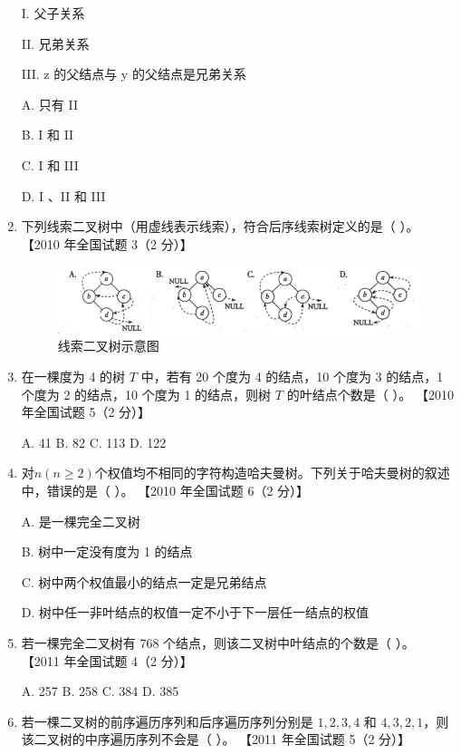 \documentclass[lang=cn,newtx,10pt,scheme=chinese]{../../elegantbook}
\begin{document}
\begin{enumerate}
    I. 父子关系  

    II. 兄弟关系  

    III. z 的父结点与 y 的父结点是兄弟关系  

    A. 只有 II  

    B. I 和 II  

    C. I 和 III  

    D. I 、II 和 III  

    \item 下列线索二叉树中（用虚线表示线索），符合后序线索树定义的是（ ）。  
    【2010 年全国试题 3（2 分）】  

    \begin{figure}[h!]
            \centering
            \includegraphics[width=1\textwidth]{../../figure/exercisePicPDF/chapter6/6-12.pdf}
            \caption{线索二叉树示意图}
    \end{figure}

    \item 在一棵度为 4 的树 $T$ 中，若有 20 个度为 4 的结点，10 个度为 3 的结点，1 个度为 2 的结点，10 个度为 1 的结点，则树 $T$ 的叶结点个数是（ ）。  
    【2010 年全国试题 5（2 分）】 

    A. 41 \quad B. 82 \quad C. 113 \quad D. 122  

    \item 对$n(n≥2)$个权值均不相同的字符构造哈夫曼树。下列关于哈夫曼树的叙述中，错误的是（ ）。  
    【2010 年全国试题 6（2 分）】  

    A. 是一棵完全二叉树  

    B. 树中一定没有度为 1 的结点  



    C. 树中两个权值最小的结点一定是兄弟结点

    D. 树中任一非叶结点的权值一定不小于下一层任一结点的权值  

    \item 若一棵完全二叉树有 768 个结点，则该二叉树中叶结点的个数是（ ）。  
    【2011 年全国试题 4（2 分）】  

    A. 257 \quad B. 258 \quad C. 384 \quad D. 385  

    \item 若一棵二叉树的前序遍历序列和后序遍历序列分别是 $1, 2, 3, 4$ 和 $4, 3, 2, 1$，则该二叉树的中序遍历序列不会是（ ）。  
    【2011 年全国试题 5（2 分）】  


\end{enumerate}
\end{document}
